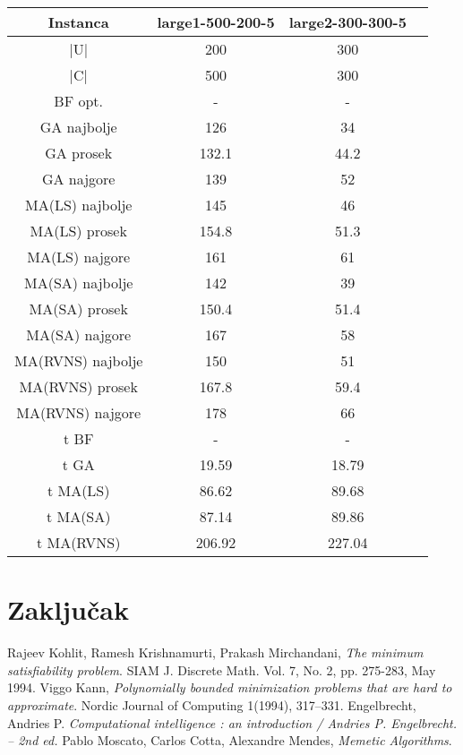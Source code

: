 \documentclass[12pt, a4paper]{article}
\theoremstyle{definition}
\begin{document}
\begin{table}
\begin{adjustbox}{width=\columnwidth,center}
\begin{tabular}{ |c|c|c|c| }
\hline
Instanca & large1-500-200-5 & large2-300-300-5 \\
\hline
|U| & 200 & 300 \\
\hline
|C| & 500 & 300 \\
\hline
BF opt. & - & - \\
\hline
GA najbolje & 126 & 34 \\
\hline
GA prosek & 132.1 & 44.2 \\
\hline
GA najgore & 139 & 52 \\
\hline
MA(LS) najbolje & 145 & 46 \\
\hline
MA(LS) prosek & 154.8 & 51.3 \\
\hline
MA(LS) najgore & 161 & 61 \\
\hline
MA(SA) najbolje & 142 & 39 \\
\hline
MA(SA) prosek & 150.4 & 51.4 \\
\hline
MA(SA) najgore & 167 & 58 \\
\hline
MA(RVNS) najbolje & 150 & 51 \\
\hline
MA(RVNS) prosek & 167.8 & 59.4 \\
\hline
MA(RVNS) najgore & 178 & 66 \\
\hline
t BF & - & - \\
\hline
t GA & 19.59 & 18.79 \\
\hline
t MA(LS) & 86.62 & 89.68 \\
\hline
t MA(SA) & 87.14 & 89.86 \\
\hline
t MA(RVNS) & 206.92 & 227.04 \\
\hline
\end{tabular}
\end{adjustbox}
\end{table}

\section{Zaključak}

\newpage

\begin{thebibliography}{9}
Rajeev Kohlit, Ramesh Krishnamurti, Prakash Mirchandani, \emph{The minimum satisfiability problem}. SIAM J. Discrete Math. Vol. 7, No. 2, pp. 275-283, May 1994.
Viggo Kann, \emph{Polynomially bounded minimization problems that are hard to approximate}. Nordic Journal of Computing 1(1994), 317–331.
Engelbrecht, Andries P. \emph{Computational intelligence : an introduction / Andries P. Engelbrecht. – 2nd ed.}
Pablo Moscato, Carlos Cotta, Alexandre Mendes, \emph{Memetic Algorithms}. 
\end{thebibliography}
\end{document}
